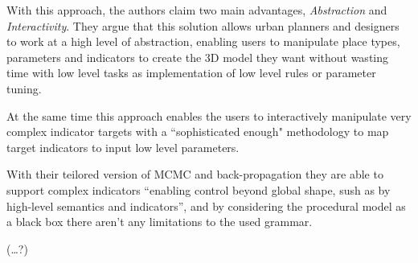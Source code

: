 With this approach, the authors claim two main advantages, \emph{Abstraction} and \emph{Interactivity}. They argue that this solution allows urban planners and designers to work at a high level of abstraction, enabling users to manipulate place types, parameters and indicators to create the 3D model they want without wasting time with low level tasks as implementation of low level rules or parameter tuning.

At the same time this approach enables the users to interactively manipulate very complex indicator targets with a ``sophisticated enough" methodology to map target indicators to input low level parameters.


With their teilored version of MCMC and back-propagation they are able to support complex indicators ``enabling control beyond global shape, sush as by high-level semantics and indicators'', and by considering the procedural model as a black box there aren't any limitations to the used grammar.




















(\dots ?)


